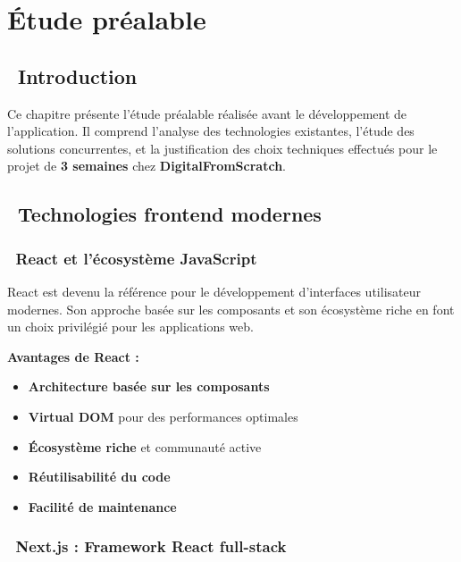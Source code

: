 \chapter{Étude préalable}

\section{\faSearch\ Introduction}

Ce chapitre présente l'étude préalable réalisée avant le développement de l'application. Il comprend l'analyse des technologies existantes, l'étude des solutions concurrentes, et la justification des choix techniques effectués pour le projet de \textbf{\color{primaryblue}3 semaines} chez \textcolor{accentgreen}{\textbf{DigitalFromScratch}}.

\section{\faCode\ Technologies frontend modernes}

\subsection{\faReact\ React et l'écosystème JavaScript}

\begin{infobox}
React est devenu la référence pour le développement d'interfaces utilisateur modernes. Son approche basée sur les composants et son écosystème riche en font un choix privilégié pour les applications web.
\end{infobox}

\textbf{\color{primaryblue}Avantages de React :}
\begin{itemize}
    \item \textcolor{accentgreen}{\textbf{Architecture basée sur les composants}}
    \item \textcolor{accentgreen}{\textbf{Virtual DOM}} pour des performances optimales
    \item \textcolor{accentgreen}{\textbf{Écosystème riche}} et communauté active
    \item \textcolor{accentgreen}{\textbf{Réutilisabilité du code}}
    \item \textcolor{accentgreen}{\textbf{Facilité de maintenance}}
\end{itemize}

\subsection{\faRocket\ Next.js : Framework React full-stack}

